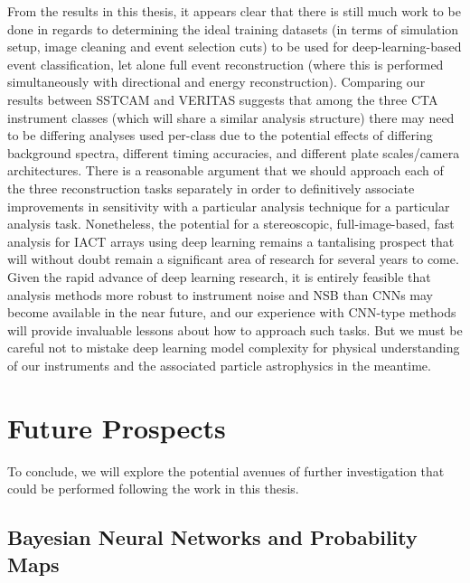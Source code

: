 From the results in this thesis, it appears clear that there is still much work to be done in regards to determining the ideal training datasets (in terms of simulation setup, image cleaning and event selection cuts) to be used for deep-learning-based event classification, let alone full event reconstruction (where this is performed simultaneously with directional and energy reconstruction). Comparing our results between SSTCAM and VERITAS suggests that among the three CTA instrument classes (which will share a similar analysis structure) there may need to be differing analyses used per-class due to the potential effects of differing background spectra, different timing accuracies, and different plate scales/camera architectures. There is a reasonable argument that we should approach each of the three reconstruction tasks separately in order to definitively associate improvements in sensitivity with a particular analysis technique for a particular analysis task. Nonetheless, the potential for a stereoscopic, full-image-based, fast analysis for IACT arrays using deep learning remains a tantalising prospect that will without doubt remain a significant area of research for several years to come. Given the rapid advance of deep learning research, it is entirely feasible that analysis methods more robust to instrument noise and NSB than CNNs may become available in the near future, and our experience with CNN-type methods will provide invaluable lessons about how to approach such tasks. But we must be careful not to mistake deep learning model complexity for physical understanding of our instruments and the associated particle astrophysics in the meantime.

\section{Future Prospects}
To conclude, we will explore the potential avenues of further investigation that could be performed following the work in this thesis.

\subsection{Bayesian Neural Networks and Probability Maps}

